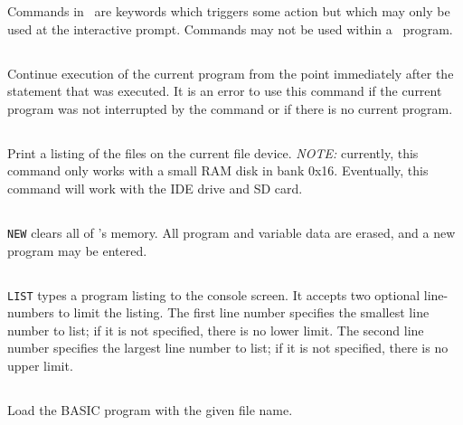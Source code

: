\documentclass{report}
\begin{document}
    Commands in \BASIC\ are keywords which triggers some action but which may only be used at the interactive prompt.
    Commands may not be used within a \BASIC\ program.

    \subsection*{}

    Continue execution of the current program from the point immediately after the  statement that was executed.
    It is an error to use this command if the current program was not interrupted by the  command or if there
    is no current program.

    \subsection*{}

    Print a listing of the files on the current file device. {\em NOTE:} currently, this command only works with a small
    RAM disk in bank 0x16. Eventually, this command will work with the IDE drive and SD card.

    \subsection*{}

    \verb+NEW+ clears all of \BASIC's memory. All program and variable data are erased, and a new program may be entered.

    \subsection*{}

    \verb+LIST+ types a program listing to the console screen. It accepts two optional line-numbers to limit the listing.
    The first line number specifies the smallest line number to list; if it is not specified, there is no lower limit.
    The second line number specifies the largest line number to list; if it is not specified, there is no upper limit.

    \subsection*{ }

    Load the BASIC program with the given file name.
    
\end{document}
